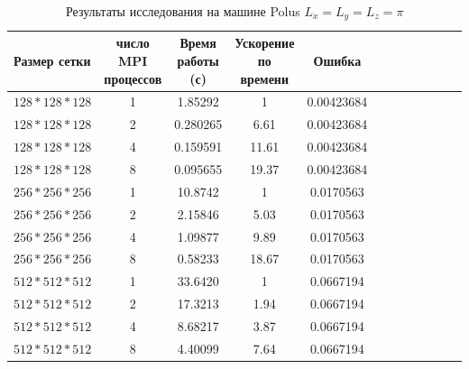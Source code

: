 \documentclass{article}
\begin{document}
       \begin{table}[!t]
        \centering
        \caption{Результаты исследования на машине Polus \(L_x = L_y = L_z = \pi\)}\label{tab:tab1}
        \begin{tabularx}{\textwidth}{@{}l*{10}{C}c@{}} %
            \toprule
            \bf Размер сетки & \bf число MPI процессов  & \bf Время работы (с) & \bf Ускорение по времени & \bf Ошибка \\
                \midrule
                \(128*128*128\) & 1 & 1.85292  & 1     & 0.00423684\\
                \(128*128*128\) & 2 & 0.280265 & 6.61  & 0.00423684\\
                \(128*128*128\) & 4 & 0.159591 & 11.61  & 0.00423684\\
                \(128*128*128\) & 8 & 0.095655 & 19.37  & 0.00423684\\
                \midrule
                \(256*256*256\) & 1 & 10.8742 & 1     & 0.0170563 \\
                \(256*256*256\) & 2 & 2.15846 & 5.03  & 0.0170563 \\
                \(256*256*256\) & 4 & 1.09877 & 9.89  & 0.0170563 \\
                \(256*256*256\) & 8 & 0.58233 & 18.67 & 0.0170563 \\
                \midrule
                \(512*512*512\) & 1 & 33.6420 & 1      & 0.0667194 \\
                \(512*512*512\) & 2 & 17.3213 & 1.94   & 0.0667194 \\
                \(512*512*512\) & 4 & 8.68217 & 3.87   & 0.0667194 \\
                \(512*512*512\) & 8 & 4.40099 & 7.64   & 0.0667194 \\
                \bottomrule
            \end{tabularx}
        \end{table}
        \clearpage
\end{document}
